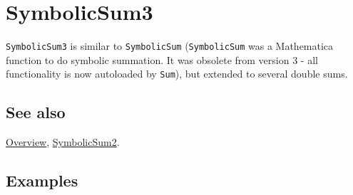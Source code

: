 \documentclass[../FeynCalcManual.tex]{subfiles}
\begin{document}
\hypertarget{symbolicsum3}{%
\section{SymbolicSum3}\label{symbolicsum3}}

\texttt{SymbolicSum3} is similar to \texttt{SymbolicSum}
(\texttt{SymbolicSum} was a Mathematica function to do symbolic
summation. It was obsolete from version 3 - all functionality is now
autoloaded by \texttt{Sum}), but extended to several double sums.

\subsection{See also}

\hyperlink{toc}{Overview}, \hyperlink{symbolicsum2}{SymbolicSum2}.

\subsection{Examples}
\end{document}

